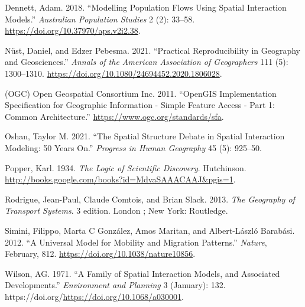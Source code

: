 \documentclass[11pt,letterpaper]{article}
\newlength{\cslhangindent}
\newlength{\cslentryspacingunit} %
\newenvironment{CSLReferences}[2] %
 {%
  \setlength{\parindent}{0pt}
  \ifodd #1
  \let\oldpar\par
  \def\par{\hangindent=\cslhangindent\oldpar}
  \fi
  \setlength{\parskip}{#2\cslentryspacingunit}
 }%
 {}
\begin{document}
\hypertarget{refs}{}
\begin{CSLReferences}{1}{0}
\leavevmode{}%
Dennett, Adam. 2018. {``Modelling Population Flows Using Spatial Interaction Models.''} \emph{Australian Population Studies} 2 (2): 33--58. \url{https://doi.org/10.37970/aps.v2i2.38}.

\leavevmode{}%
Nüst, Daniel, and Edzer Pebesma. 2021. {``Practical Reproducibility in Geography and Geosciences.''} \emph{Annals of the American Association of Geographers} 111 (5): 1300--1310. \url{https://doi.org/10.1080/24694452.2020.1806028}.

\leavevmode{}%
(OGC) Open Geospatial Consortium Inc. 2011. {``OpenGIS Implementation Specification for Geographic Information - Simple Feature Access - Part 1: Common Architecture.''} \url{https://www.ogc.org/standards/sfa}.

\leavevmode{}%
Oshan, Taylor M. 2021. {``The Spatial Structure Debate in Spatial Interaction Modeling: 50 Years On.''} \emph{Progress in Human Geography} 45 (5): 925--50.

\leavevmode{}%
Popper, Karl. 1934. \emph{The Logic of Scientific Discovery}. Hutchinson. \url{http://books.google.com/books?id=MdvaSAAACAAJ\&pgis=1}.

\leavevmode{}%
Rodrigue, Jean-Paul, Claude Comtois, and Brian Slack. 2013. \emph{The Geography of Transport Systems}. 3 edition. London ; New York: Routledge.

\leavevmode{}%
Simini, Filippo, Marta C González, Amos Maritan, and Albert-László Barabási. 2012. {``A Universal Model for Mobility and Migration Patterns.''} \emph{Nature}, February, 812. \url{https://doi.org/10.1038/nature10856}.

\leavevmode{}%
Wilson, AG. 1971. {``A Family of Spatial Interaction Models, and Associated Developments.''} \emph{Environment and Planning} 3 (January): 132. https://doi.org/\url{https://doi.org/10.1068/a030001}.

\end{CSLReferences}




\setlength{\bibsep}{0.00cm plus 0.05cm} %


\end{document}
